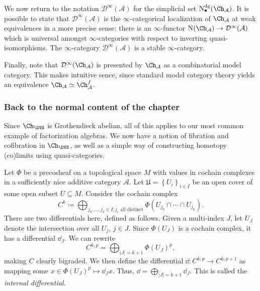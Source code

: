 We now return to the notation $\mathcal{D}^{\infty } (\mathcal{A} )$ for the simplicial set $\mathrm{N} ^{\mathrm{dg} } _{\bullet} (\Ch_{\mathcal{A} } )$. It is possible to state that $\mathcal{D} ^{\infty } (\mathcal{A} )$ is the $\infty $-categorical localization of $\Ch_{\mathcal{A} } $ at weak equivalences in a more precise sense: there is an $\infty $-functor $\mathrm{N} (\Ch_{\mathcal{A} } )\to \mathcal{D} ^{\infty } (\mathcal{A} )$ which is universal amongst $\infty $-categories with respect to inverting quasi-isomorphisms. The $\infty $-category $\mathcal{D} ^{\infty } (\mathcal{A} )$ is a stable $\infty $-category.

Finally, note that $\mathcal{D} ^{\infty } (\Ch_{\mathcal{A} } )$ is presented by $\Ch_{\mathcal{A} } $ as a combinatorial model category. This makes intuitive sence, since standard model category theory yields an equivalence $\Ch_{\mathcal{A} } \simeq \Ch_{\mathcal{A} } ^{f} $.


\subsubsection{Back to the normal content of the chapter}

Since $\Ch_{\DVS } $ is Grothendieck abelian, all of this applies to our most common example of factorization algebras. We now have a notion of fibration and cofibration in $\Ch_{\DVS }$, as well as a simple way of constructing homotopy (co)limits using quasi-categories.

Let $\Phi $ be a precosheaf on a topological space $M$ with values in cochain complexes in a sufficiently nice additive category $\mathcal{A} $. Let $\mathfrak{U} =\left\{ U_i \right\}_{i\in I} $ be an open cover of some open subset $U\subseteq M$. Consider the cochain complex
\[
	C^k \coloneqq \bigoplus_{j_0, \ldots , j_k\in I ; j_i\text{ all distinct} } \Phi (U_{j_0} \cap \cdots \cap U_{j_k} )
.\]
There are two differentials here, defined as follows. Given a multi-index $J$, let $U_J$ denote the intersection over all $U_j$, $j\in J$. Since $\Phi (U_J)$ is a cochain complex,  it has a differential $\dd _{J} $. We can rewrite
\[
	C^{k,p}  = \bigoplus_{\left| J \right| =k+1} \Phi (U_J)^p
,\]
making $C$ clearly bigraded. We then define the differential $\dd : C^{k, p}  \to C^{k, p+1} $ as mapping some $x\in \Phi (U_J)^p \mapsto \dd _Jx$. Thus, $\dd =\bigoplus_{\left| J \right| =k+1} \dd _J$. This is called the \emph{internal differential}.

